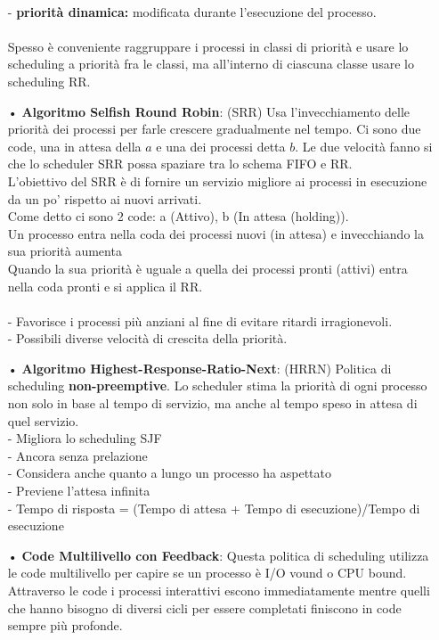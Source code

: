 \documentclass{article}
\begin{document}
\begin{enumerate}
      \\- \textbf{priorità dinamica:} modificata durante l'esecuzione del processo.
      \\
      \\Spesso è conveniente raggruppare i processi in classi di priorità e usare lo scheduling a priorità fra le classi, ma all'interno di ciascuna classe usare lo scheduling RR.
   \item[•] \textbf{Algoritmo Selfish Round Robin}: (SRR) Usa l'invecchiamento delle priorità dei processi per farle crescere gradualmente nel tempo. Ci sono due code, una in attesa della $a$ e una dei processi detta $b$. Le due velocità fanno si che lo scheduler SRR possa spaziare tra lo schema FIFO e RR.
      \\L'obiettivo del SRR è di fornire un servizio migliore ai processi in esecuzione da un po' rispetto ai nuovi arrivati.
      \\Come detto ci sono 2 code: a (Attivo), b (In attesa (holding)).
      \\Un processo entra nella coda dei processi nuovi (in attesa) e invecchiando la sua priorità aumenta 
      \\Quando la sua priorità è uguale a quella dei processi pronti (attivi) entra nella coda pronti e si applica il RR.
      \\\\- Favorisce i processi più anziani al fine di evitare ritardi irragionevoli.
      \\- Possibili diverse velocità di crescita della priorità.
   \item[•] \textbf{Algoritmo Highest-Response-Ratio-Next}: (HRRN) Politica di scheduling \textbf{non-preemptive}. Lo scheduler stima la priorità di ogni processo non solo in base al tempo di servizio, ma anche al tempo speso in attesa di quel servizio.
      \\- Migliora lo scheduling SJF
      \\- Ancora senza prelazione 
      \\- Considera anche quanto a lungo un processo ha aspettato 
      \\- Previene l'attesa infinita
      \\- Tempo di risposta = (Tempo di attesa + Tempo di esecuzione)/Tempo di esecuzione 
   \item[•] \textbf{Code Multilivello con Feedback}: Questa politica di scheduling utilizza le code multilivello per capire se un processo è I/O vound o CPU bound. Attraverso le code i processi interattivi escono immediatamente mentre quelli che hanno bisogno di diversi cicli per essere completati finiscono in code sempre più profonde.

\end{enumerate}
\end{document}
